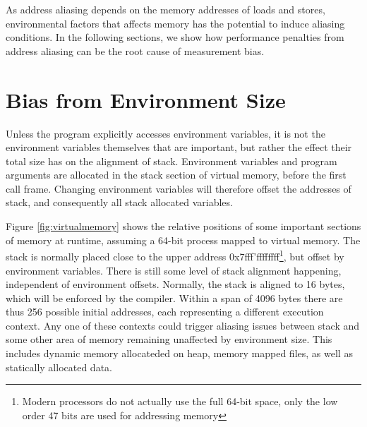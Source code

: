 \documentclass[a4paper,10pt,twocolumn,twoside]{article}
\begin{document}
As address aliasing depends on the memory addresses of loads and stores, environmental factors that affects memory has the potential to induce aliasing conditions.
In the following sections, we show how performance penalties from address aliasing can be the root cause of measurement bias.



\section{Bias from Environment Size}

Unless the program explicitly accesses environment variables, it is not the environment variables themselves that are important, but rather the effect their total size has on the alignment of stack.
Environment variables and program arguments are allocated in the stack section of virtual memory, before the first call frame.
Changing environment variables will therefore offset the addresses of stack, and consequently all stack allocated variables.

Figure \ref{fig:virtualmemory} shows the relative positions of some important sections of memory at runtime, assuming a 64-bit process mapped to virtual memory. 
The stack is normally placed close to the upper address 0x7fff'ffffffff\footnote{Modern processors do not actually use the full 64-bit space, only the low order 47 bits are used for addressing memory}, but offset by environment variables.
There is still some level of stack alignment happening, independent of environment offsets. 
Normally, the stack is aligned to 16 bytes, which will be enforced by the compiler. %
Within a span of 4096 bytes there are thus 256 possible initial addresses, each representing a different execution context.
Any one of these contexts could trigger aliasing issues between stack and some other area of memory remaining unaffected by environment size.
This includes dynamic memory allocateded on heap, memory mapped files, as well as statically allocated data. 
\end{document}
